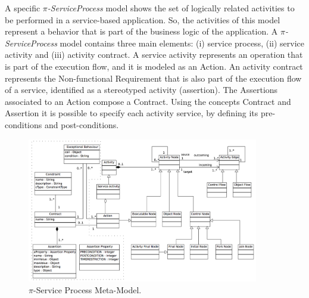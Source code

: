\documentclass[12pt,twoside]{article}
\theoremstyle{plain}
\theoremstyle{plain}
\begin{document}
\begin{multicols}{2}
A specific \textit{$\pi$-ServiceProcess} model shows the set of logically related activities to be performed in a service-based application.
So, the activities of this model represent a behavior that is part of the business logic of the application.
A \textit{$\pi$-ServiceProcess}  model contains three main elements: (i) service process, (ii) service activity and (iii) activity contract. A service activity represents an operation that is part of the execution flow, and it is modeled as an {\sc Action}.
An activity contract represents the {\sc Non-functional Requirement}  that is also part of the execution flow of a service, identified  as a stereotyped activity ({\sf assertion}).
The {\sc Assertion}s associated to an {\sc Action} compose a {\sc Contract}. 
Using the concepts {\sc Contract} and {\sc Assertion} it is possible to specify each activity service, by defining its pre-conditions and post-conditions.

\begin{figure}
\center
\includegraphics[width=0.9\textwidth]{ServiceProcessMetaModel.pdf}
\caption{\label{fig:CIM:serviceprocessmetamodel} $\pi$-Service Process Meta-Model.}
\end{figure}



\end{multicols}
\end{document}

